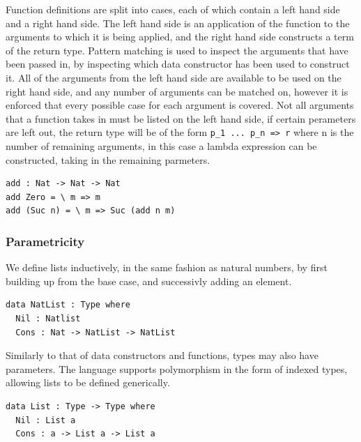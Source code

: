 \documentclass[a4paper]{article}
\begin{document}
Function definitions are split into cases, each of which contain 
a left hand side and a right hand side.
The left hand side is an application of the function to the arguments
to which it is being applied, and the right hand side constructs a term
of the return type. Pattern matching is used to inspect the arguments
that have been passed in, by inspecting which data constructor has been
used to construct it. All of the arguments from the left hand side are
available to be used on the right hand side, and any number of arguments
can be matched on, however it is enforced that every possible case for 
each argument is covered. Not all arguments that a function takes in 
must be listed on the left hand side, if certain perameters are left out,
the return type will be of the form \texttt{p\_1 ... p\_n => r} where n is the 
number of remaining arguments, in this case a lambda expression can be 
constructed, taking in the remaining parmeters. 

\begin{center}
\begin{verbatim}
add : Nat -> Nat -> Nat
add Zero = \ m => m
add (Suc n) = \ m => Suc (add n m)
\end{verbatim}
\end{center}

\subsubsection{Parametricity}
\label{sec:orgf849407}

We define lists inductively, in the same fashion as natural numbers, by
first building up from the base case, and successivly adding an element.

\begin{center}
\begin{verbatim}
data NatList : Type where
  Nil : Natlist
  Cons : Nat -> NatList -> NatList 
\end{verbatim}
\end{center}

Similarly to that of data constructors and functions, types may 
also have parameters. The language supports polymorphism in the form of
indexed types, allowing lists to be defined generically. 

\begin{center}
\begin{verbatim}
data List : Type -> Type where
  Nil : List a
  Cons : a -> List a -> List a
\end{verbatim}
\end{center}
\end{document}

